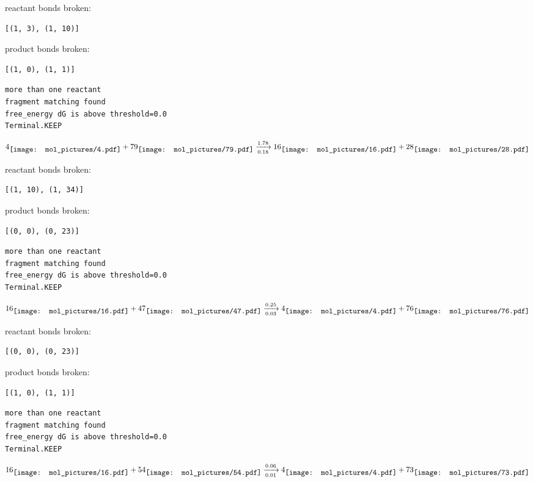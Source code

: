 \documentclass{article}
\begin{document}
reactant bonds broken:\begin{verbatim}
[(1, 3), (1, 10)]
\end{verbatim}
product bonds broken:\begin{verbatim}
[(1, 0), (1, 1)]
\end{verbatim}




\vspace{1cm}
\begin{verbatim}
more than one reactant
fragment matching found
free_energy dG is above threshold=0.0
Terminal.KEEP
\end{verbatim}
$$
4
\raisebox{-.5\height}{\texttt{[image: mol\_pictures/4.pdf]}}
+
79
\raisebox{-.5\height}{\texttt{[image: mol\_pictures/79.pdf]}}
\xrightarrow[0.18]{1.78}
16
\raisebox{-.5\height}{\texttt{[image: mol\_pictures/16.pdf]}}
+
28
\raisebox{-.5\height}{\texttt{[image: mol\_pictures/28.pdf]}}
$$


reactant bonds broken:\begin{verbatim}
[(1, 10), (1, 34)]
\end{verbatim}
product bonds broken:\begin{verbatim}
[(0, 0), (0, 23)]
\end{verbatim}




\vspace{1cm}
\begin{verbatim}
more than one reactant
fragment matching found
free_energy dG is above threshold=0.0
Terminal.KEEP
\end{verbatim}
$$
16
\raisebox{-.5\height}{\texttt{[image: mol\_pictures/16.pdf]}}
+
47
\raisebox{-.5\height}{\texttt{[image: mol\_pictures/47.pdf]}}
\xrightarrow[0.03]{0.25}
4
\raisebox{-.5\height}{\texttt{[image: mol\_pictures/4.pdf]}}
+
76
\raisebox{-.5\height}{\texttt{[image: mol\_pictures/76.pdf]}}
$$


reactant bonds broken:\begin{verbatim}
[(0, 0), (0, 23)]
\end{verbatim}
product bonds broken:\begin{verbatim}
[(1, 0), (1, 1)]
\end{verbatim}




\vspace{1cm}
\begin{verbatim}
more than one reactant
fragment matching found
free_energy dG is above threshold=0.0
Terminal.KEEP
\end{verbatim}
$$
16
\raisebox{-.5\height}{\texttt{[image: mol\_pictures/16.pdf]}}
+
54
\raisebox{-.5\height}{\texttt{[image: mol\_pictures/54.pdf]}}
\xrightarrow[0.01]{0.06}
4
\raisebox{-.5\height}{\texttt{[image: mol\_pictures/4.pdf]}}
+
73
\raisebox{-.5\height}{\texttt{[image: mol\_pictures/73.pdf]}}
$$
\end{document}
